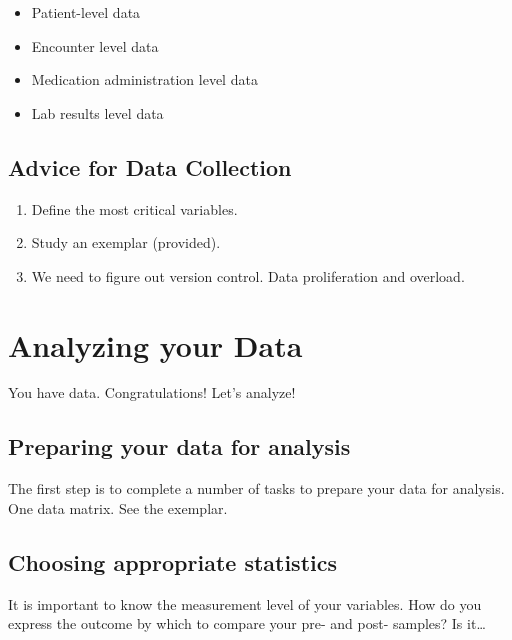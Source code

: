 \documentclass[
]{report}
\providecommand{\tightlist}{%
  \setlength{\itemsep}{0pt}\setlength{\parskip}{0pt}}
\begin{document}
\begin{itemize}
\tightlist
\item
  Patient-level data
\item
  Encounter level data
\item
  Medication administration level data
\item
  Lab results level data
\end{itemize}

\hypertarget{advice-for-data-collection}{%
\section{Advice for Data Collection}\label{advice-for-data-collection}}

\begin{enumerate}
\def\labelenumi{\arabic{enumi}.}
\item
  Define the most critical variables.
\item
  Study an exemplar (provided).
\item
  We need to figure out version control. Data proliferation and
  overload.
\end{enumerate}

\hypertarget{analyzing-your-data}{%
\chapter{Analyzing your Data}\label{analyzing-your-data}}

You have data. Congratulations! Let's analyze!

\hypertarget{preparing-your-data-for-analysis}{%
\section{Preparing your data for
analysis}\label{preparing-your-data-for-analysis}}

The first step is to complete a number of tasks to prepare your data for
analysis. One data matrix. See the exemplar.

\hypertarget{choosing-appropriate-statistics}{%
\section{Choosing appropriate
statistics}\label{choosing-appropriate-statistics}}

It is important to know the measurement level of your variables. How do
you express the outcome by which to compare your pre- and post- samples?
Is it\ldots{}
\end{document}
